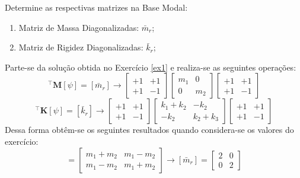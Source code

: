 \documentclass{article}
\begin{document}
\newpage\begin{exercise}\label{ex2}
    Determine as respectivas matrizes na Base Modal:
    \begin{enumerate}
        \item Matriz de Massa Diagonalizadas: $\bar{m}_r$;
        \item Matriz de Rigidez Diagonalizadas: $\bar{k}_r$;
    \end{enumerate}
\end{exercise}
\begin{resolution}
    Parte-se da solução obtida no Exercício \ref{ex1} e realiza-se as seguintes operações:
    \begin{equation*}
        [\psi]^\intercal \mathbf{M} [\psi] = [\bar{m}_r] \to 
        \begin{bmatrix} +1 & +1\\ +1 & -1\end{bmatrix} 
        \begin{bmatrix} m_1 & 0\\ 0 & m_2\end{bmatrix} 
        \begin{bmatrix} +1 & +1\\ +1 & -1\end{bmatrix}
    \end{equation*}
    \begin{equation*}
        [\psi]^\intercal \mathbf{K} [\psi] = [\bar{k}_r] \to 
        \begin{bmatrix} +1 & +1\\ +1 & -1\end{bmatrix} 
        \begin{bmatrix} k_1 + k_2 & -k_2\\ -k_2 & k_2 + k_3\end{bmatrix} 
        \begin{bmatrix} +1 & +1\\ +1 & -1\end{bmatrix}
    \end{equation*}
    Dessa forma obtêm-se os seguintes resultados quando considera-se os valores do exercício:
    \begin{equation*}
        [\bar{m}_r] = 
        \begin{bmatrix} m_1+m_2 & m_1-m_2\\ m_1-m_2 & m_1+m_2\end{bmatrix} \to 
        \boxed{[\bar{m}_r] = \begin{bmatrix} 2 & 0\\ 0 & 2\end{bmatrix}}

\end{equation*}
\end{resolution}
\end{document}
